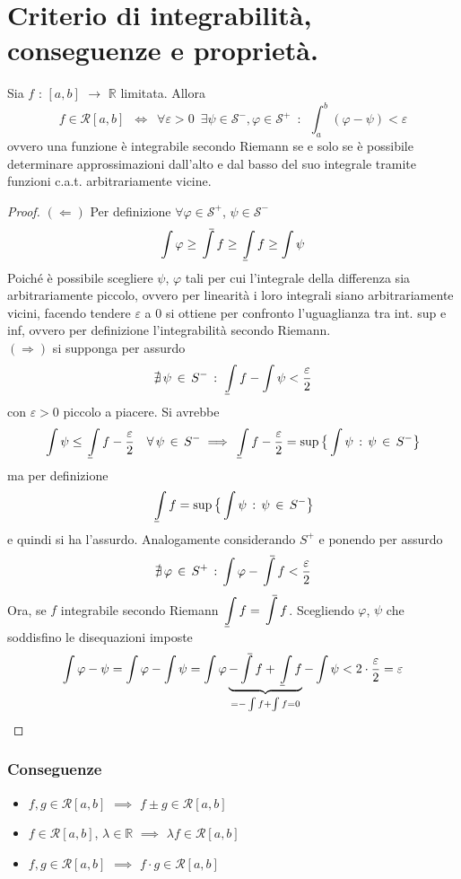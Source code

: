\documentclass[10pt, oneside]{book}
\theoremstyle{plain}
\def\upint{\mathchoice%
    {\mkern13mu\overline{\vphantom{\intop}\mkern7mu}\mkern-20mu}%
    {\mkern7mu\overline{\vphantom{\intop}\mkern7mu}\mkern-14mu}%
    {\mkern7mu\overline{\vphantom{\intop}\mkern7mu}\mkern-14mu}%
    {\mkern7mu\overline{\vphantom{\intop}\mkern7mu}\mkern-14mu}%
  \int}
\def\lowint{\mkern3mu\underline{\vphantom{\intop}\mkern7mu}\mkern-10mu\int}
\begin{document}
\section{Criterio di integrabilità, conseguenze e proprietà.}
\begin{prop}
    Sia $f$ : $[a,b]$ $\rightarrow$ $\mathbb{R}$  limitata. Allora
    \[f \in \mathcal{R}[a,b] \enspace \Leftrightarrow \enspace \forall \varepsilon > 0 \enspace \exists \psi \in \mathcal{S}^- , \varphi \in \mathcal{S}^+ \enspace : \enspace \int_a^b (\varphi - \psi) < \varepsilon\]
    ovvero una funzione è integrabile secondo Riemann se e solo se è possibile determinare approssimazioni dall'alto e dal basso del suo integrale tramite funzioni c.a.t. arbitrariamente vicine.
\end{prop}
\begin{proof}
    $(\Leftarrow)$ Per definizione $\forall \varphi \in  \mathcal{S}^+$, $\psi \in  \mathcal{S}^-$ 
    \[\int \varphi \geq \upint f \geq \lowint f \geq \int \psi\]
     Poiché è possibile scegliere $\psi$, $\varphi$ tali per cui l'integrale della differenza sia arbitrariamente piccolo, ovvero per linearità i loro integrali siano arbitrariamente vicini, facendo tendere $\varepsilon$ a 0 si ottiene per confronto l'uguaglianza tra int. sup e inf, ovvero per definizione l'integrabilità secondo Riemann.
    \\$(\Rightarrow)$ si supponga per assurdo
    \[\nexists \, \psi \, \in \, S^- \, : \, \lowint f - \int \psi < \frac{\varepsilon}{2}\]
con $\varepsilon > 0$ piccolo a piacere. Si avrebbe
\[\int \psi \leq \lowint f - \frac{\varepsilon}{2} \quad \forall \, \psi \, \in \, S^- \implies \lowint f - \frac{\varepsilon}{2} = \sup \big\{ \int \psi \, : \, \psi \, \in \, S^-\big\}\]    
ma per definizione
\[\lowint f = \sup \big\{ \int \psi \, : \, \psi \, \in \, S^-\big\}\]
e quindi si ha l'assurdo. Analogamente considerando $S^+$ e ponendo per assurdo
\[\nexists \, \varphi \, \in \, S^+ \, : \, \int \varphi - \upint f < \frac{\varepsilon}{2}\]
Ora, se $f$ integrabile secondo Riemann $\displaystyle \lowint f = \upint f$. Scegliendo $\varphi$, $\psi$ che soddisfino le disequazioni imposte  
  \[\int \varphi - \psi = \int \varphi - \int \psi = \int \varphi \underbrace{- \upint f + \lowint f}_{= - \int f + \int f = 0} - \int \psi < 2 \cdot \frac{\varepsilon}{2} = \varepsilon\]
\end{proof}

\subsubsection*{Conseguenze}
\begin{itemize}[label=$\ast$]
    \item $f, g \in \mathcal{R}[a,b] $ $\implies$ $f \pm g \in \mathcal{R}[a,b] $
    \item $f \in \mathcal{R}[a,b] $, $\lambda \in \mathbb{R}$ $\implies$ $\lambda f \in \mathcal{R}[a,b] $
    \item  $f, g \in \mathcal{R}[a,b] $ $\implies$ $f \cdot g \in \mathcal{R}[a,b] $
\end{itemize}
\end{document}

